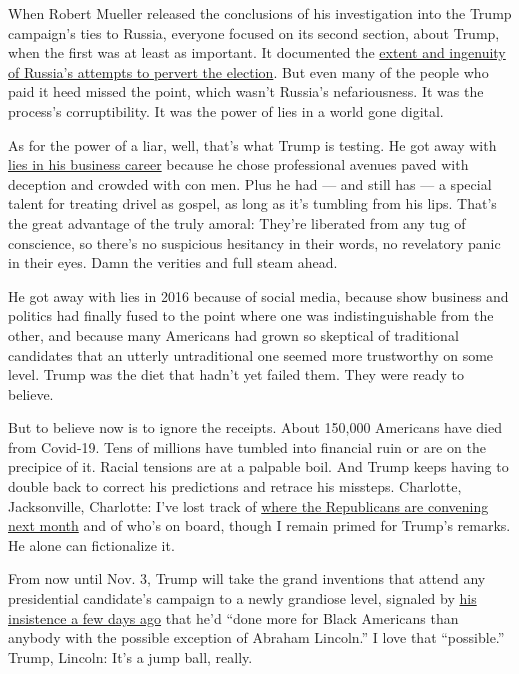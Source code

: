 When Robert Mueller released the conclusions of his investigation into
the Trump campaign's ties to Russia, everyone focused on its second
section, about Trump, when the first was at least as important. It
documented the
\href{https://www.pbs.org/newshour/show/inside-the-mueller-report-a-sophisticated-russian-interference-campaign}{extent
and ingenuity of Russia's attempts to pervert the election}. But even
many of the people who paid it heed missed the point, which wasn't
Russia's nefariousness. It was the process's corruptibility. It was the
power of lies in a world gone digital.

As for the power of a liar, well, that's what Trump is testing. He got
away with
\href{https://www.nytimes3xbfgragh.onion/2016/07/17/us/politics/donald-trump-business.html}{lies
in his business career} because he chose professional avenues paved with
deception and crowded with con men. Plus he had --- and still has --- a
special talent for treating drivel as gospel, as long as it's tumbling
from his lips. That's the great advantage of the truly amoral: They're
liberated from any tug of conscience, so there's no suspicious hesitancy
in their words, no revelatory panic in their eyes. Damn the verities and
full steam ahead.

He got away with lies in 2016 because of social media, because show
business and politics had finally fused to the point where one was
indistinguishable from the other, and because many Americans had grown
so skeptical of traditional candidates that an utterly untraditional one
seemed more trustworthy on some level. Trump was the diet that hadn't
yet failed them. They were ready to believe.

But to believe now is to ignore the receipts. About 150,000 Americans
have died from Covid-19. Tens of millions have tumbled into financial
ruin or are on the precipice of it. Racial tensions are at a palpable
boil. And Trump keeps having to double back to correct his predictions
and retrace his missteps. Charlotte, Jacksonville, Charlotte: I've lost
track of
\href{https://www.cnn.com/2020/07/23/politics/rnc-jacksonville/index.html}{where
the Republicans are convening next month} and of who's on board, though
I remain primed for Trump's remarks. He alone can fictionalize it.

From now until Nov. 3, Trump will take the grand inventions that attend
any presidential candidate's campaign to a newly grandiose level,
signaled by
\href{https://www.whitehouse.gov/briefings-statements/remarks-president-trump-press-briefing-072220/}{his
insistence a few days ago} that he'd ``done more for Black Americans
than anybody with the possible exception of Abraham Lincoln.'' I love
that ``possible.'' Trump, Lincoln: It's a jump ball, really.

